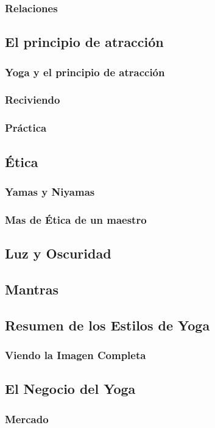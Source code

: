 \documentclass[a4paper]{article}
\begin{document}
\subsubsection{Relaciones}
\subsection{El principio de atracción}
\subsubsection{Yoga y el principio de atracción}
\subsubsection{Reciviendo}
\subsubsection{Práctica}
\subsection{Ética}
\subsubsection{Yamas y Niyamas}
\subsubsection{Mas de Ética de un maestro}
\subsection{Luz y Oscuridad}
\subsection{Mantras}
\subsection{Resumen de los Estilos de Yoga}
\subsubsection{Viendo la Imagen Completa}
\subsection{El Negocio del Yoga}
\subsubsection{Mercado}
\end{document}
